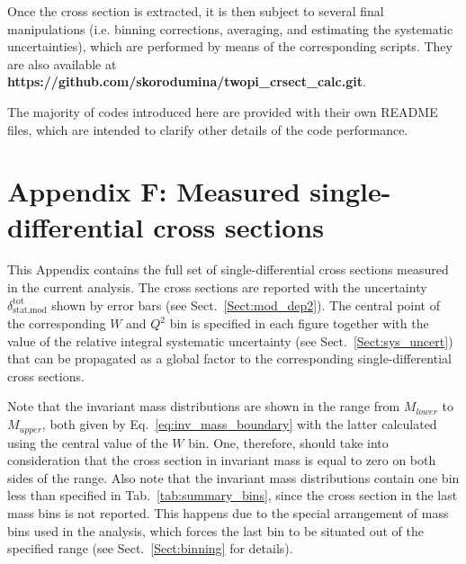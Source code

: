 Once the cross section is extracted, it is then subject to several final manipulations (i.e. binning corrections, averaging, and estimating the systematic uncertainties), which are performed by means of the corresponding scripts. They are also available at {\bf https://github.com/skorodumina/twopi\_crsect\_calc.git}.


The majority of codes introduced here are provided with their own README files, which are intended to clarify other details of the code performance.




\newpage



\renewcommand{\thesection}{F}
    \makeatletter
   \renewcommand{\theequation}{\thesection.\@arabic\c@equation}
    \makeatother
\section*{Appendix F: Measured single-differential cross sections }
\label{app_cr_sect}

This Appendix contains the full set of single-differential cross sections measured in the current analysis. The cross sections are reported with the uncertainty $\delta_{\text{stat,mod}}^{\text{tot}}$ shown by error bars (see Sect.~\ref{Sect:mod_dep2}). The central point of the corresponding $W$ and $Q^{2}$ bin is specified in each figure together with the value of the relative integral systematic uncertainty (see Sect.~\ref{Sect:sys_uncert}) that can be propagated as a global factor to the corresponding single-differential cross sections.

Note that the invariant mass distributions are shown in the range from $M_{lower}$ to $M_{upper}$, both given by Eq.~\eqref{eq:inv_mass_boundary} with the latter calculated using the central value of the $W$ bin. One, therefore, should take into consideration that the cross section in invariant mass is equal to zero on both sides of the range. Also note that the invariant mass distributions contain one bin less than specified in Tab.~\ref{tab:summary_bins}, since the cross section in the last mass bins is not reported. This happens due to the special arrangement of mass bins used in the analysis, which forces the last bin to be situated out of the specified range (see Sect.~\ref{Sect:binning} for details).  

